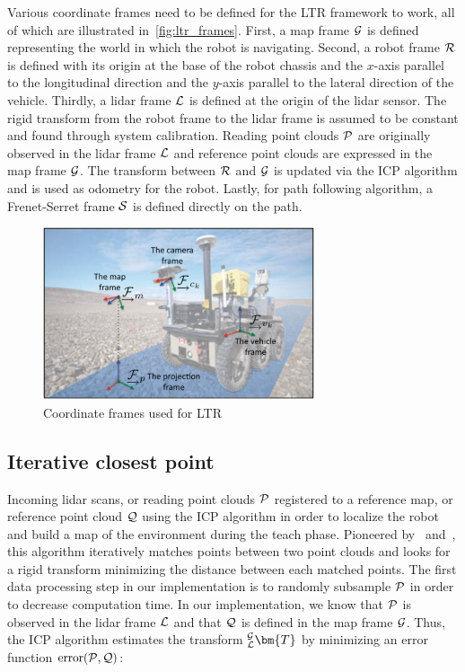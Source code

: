 Various coordinate frames need to be defined for the \ac{LTR} framework to work, all of which are illustrated in~\autoref{fig:ltr_frames}.
First, a map frame $\mathcal{G}$ is defined representing the world in which the robot is navigating.
Second, a robot frame $\mathcal{R}$ is defined with its origin at the base of the robot chassis and the $x$-axis parallel to the longitudinal direction and the $y$-axis parallel to the lateral direction of the vehicle.
Thirdly, a lidar frame $\mathcal{L}$ is defined at the origin of the lidar sensor. 
The rigid transform from the robot frame to the lidar frame \transform{\robotf}{\lidarf} is assumed to be constant and found through system calibration.
Reading point clouds $\mathcal{P}$ are originally observed in the lidar frame $\mathcal{L}$ and reference point clouds are expressed in the map frame $\mathcal{G}$.
The transform between $\mathcal{R}$ and $\mathcal{G}$ \transform{\robotf}{\mapf} is updated via the \ac{ICP} algorithm and is used as odometry for the robot.
Lastly, for path following algorithm, a Frenet-Serret frame $\mathcal{S}$ is defined directly on the path.

\begin{figure} [htpb]
	\centering
	\includegraphics[height=2.0in]{figs/warthog_frames.pdf}
	\caption{Coordinate frames used for \ac{LTR}}
	\label{fig:ltr_frames}
\end{figure}

\subsection{Iterative closest point}
\label{ICP}

Incoming lidar scans, or reading point clouds $\mathcal{P}$ registered to a reference map, or reference point cloud $\mathcal{Q}$ using the \ac{ICP} algorithm in order to localize the robot and build a map of the environment during the teach phase.
Pioneered by~\citet{Besl1992} and~\citet{Chen1991}, this algorithm iteratively matches points between two point clouds and looks for a rigid transform minimizing the distance between each matched points.
The first data processing step in our implementation is to randomly subsample $\mathcal{P}$ in order to decrease computation time.
In our implementation, we know that $\mathcal{P}$ is observed in the lidar frame $\mathcal{L}$ and that $\mathcal{Q}$ is defined in the map frame $\mathcal{G}$. 
Thus, the \ac{ICP} algorithm estimates the transform $_{\lidarf}^{\mapf}\bm{T}$ by minimizing an error function $\text{error}(\mathcal{P}, \mathcal{Q})$:

